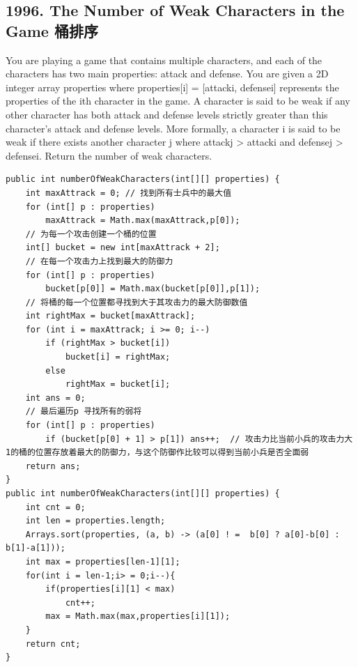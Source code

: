 \documentclass[9pt, b5paaper]{book}
\begin{document}
\subsection{1996. The Number of Weak Characters in the Game 桶排序}
\label{sec-9-0-1}
You are playing a game that contains multiple characters, and each of the characters has two main properties: attack and defense. You are given a 2D integer array properties where properties[i] = [attacki, defensei] represents the properties of the ith character in the game.
A character is said to be weak if any other character has both attack and defense levels strictly greater than this character's attack and defense levels. More formally, a character i is said to be weak if there exists another character j where attackj > attacki and defensej > defensei.
Return the number of weak characters.
\begin{verbatim}
public int numberOfWeakCharacters(int[][] properties) {
    int maxAttrack = 0; // 找到所有士兵中的最大值
    for (int[] p : properties)
        maxAttrack = Math.max(maxAttrack,p[0]);
    // 为每一个攻击创建一个桶的位置
    int[] bucket = new int[maxAttrack + 2];     
    // 在每一个攻击力上找到最大的防御力
    for (int[] p : properties)
        bucket[p[0]] = Math.max(bucket[p[0]],p[1]);
    // 将桶的每一个位置都寻找到大于其攻击力的最大防御数值
    int rightMax = bucket[maxAttrack];
    for (int i = maxAttrack; i >= 0; i--) 
        if (rightMax > bucket[i])
            bucket[i] = rightMax;
        else
            rightMax = bucket[i];
    int ans = 0;
    // 最后遍历p 寻找所有的弱将
    for (int[] p : properties)
        if (bucket[p[0] + 1] > p[1]) ans++;  // 攻击力比当前小兵的攻击力大1的桶的位置存放着最大的防御力，与这个防御作比较可以得到当前小兵是否全面弱
    return ans;
}
public int numberOfWeakCharacters(int[][] properties) {
    int cnt = 0;
    int len = properties.length;
    Arrays.sort(properties, (a, b) -> (a[0] ! =  b[0] ? a[0]-b[0] : b[1]-a[1]));
    int max = properties[len-1][1];
    for(int i = len-1;i> = 0;i--){
        if(properties[i][1] < max)
            cnt++;
        max = Math.max(max,properties[i][1]);
    }
    return cnt;
}
\end{verbatim}
\end{document}
